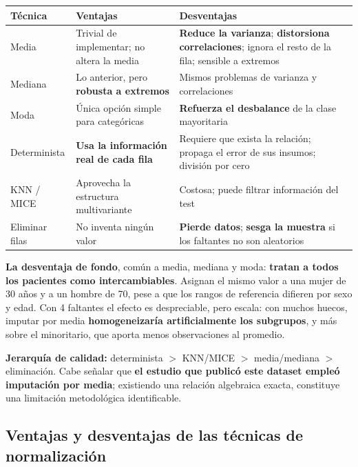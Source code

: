 \documentclass[10pt,a4paper]{article}
\begin{document}
\begin{table}[H]
\footnotesize
\begin{tabularx}{\textwidth}{@{}l X X@{}}
\toprule
\textbf{Técnica} & \textbf{Ventajas} & \textbf{Desventajas} \\
\midrule
Media & Trivial de implementar; no altera la media & \textbf{Reduce la varianza}; \textbf{distorsiona correlaciones}; ignora el resto de la fila; sensible a extremos \\
Mediana & Lo anterior, pero \textbf{robusta a extremos} & Mismos problemas de varianza y correlaciones \\
Moda & Única opción simple para categóricas & \textbf{Refuerza el desbalance} de la clase mayoritaria \\
Determinista & \textbf{Usa la información real de cada fila} & Requiere que exista la relación; propaga el error de sus insumos; división por cero \\
KNN / MICE & Aprovecha la estructura multivariante & Costosa; puede filtrar información del test \\
Eliminar filas & No inventa ningún valor & \textbf{Pierde datos}; \textbf{sesga la muestra} si los faltantes no son aleatorios \\
\bottomrule
\end{tabularx}
\end{table}

\textbf{La desventaja de fondo}, común a media, mediana y moda: \textbf{tratan a todos los pacientes como intercambiables}. Asignan el mismo valor a una mujer de 30 años y a un hombre de 70, pese a que los rangos de referencia difieren por sexo y edad. Con 4 faltantes el efecto es despreciable, pero escala: con muchos huecos, imputar por media \textbf{homogeneizaría artificialmente los subgrupos}, y más sobre el minoritario, que aporta menos observaciones al promedio.

\textbf{Jerarquía de calidad:} determinista $>$ KNN/MICE $>$ media/mediana $>$ eliminación. Cabe señalar que \textbf{el estudio que publicó este dataset empleó imputación por media}; existiendo una relación algebraica exacta, constituye una limitación metodológica identificable.

\subsection{Ventajas y desventajas de las técnicas de normalización}
\end{document}
